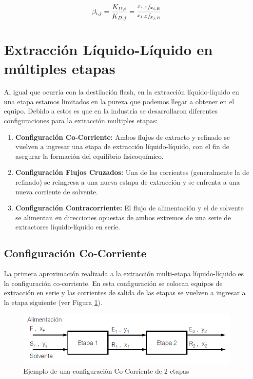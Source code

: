 \documentclass[11pt]{book}
\begin{document}
\begin{equation}
    \label{eq:Extraccion_LiqLiq_4}
    \beta_{i,j} = \frac{K_{D,i}}{K_{D,j}} = \frac{\sfrac{x_{i,E}}{x_{i,R}}}{\sfrac{x_{j,E}}{x_{j,R}}}
\end{equation}

\section{Extracción Líquido-Líquido en múltiples etapas}

Al igual que ocurría con la destilación flash, en la extracción líquido-líquido en una etapa estamos limitados en la pureza que podemos llegar a obtener en el equipo. Debido a estos es que en la industría se desarrollaron diferentes configuraciones para la extracción multiples etapas:

\begin{enumerate}
    \item \textbf{Configuración Co-Corriente:} Ambos flujos de extracto y refinado se vuelven a ingresar una etapa de extracción líquido-líquido, con el fin de asegurar la formación del equilibrio fisicoquímico.
    
    \item \textbf{Configuración Flujos Cruzados:} Una de las corrientes (generalmente la de refinado) se reingresa a una nueva estapa de extracción y se enfrenta a una nueva corriente de solvente.
    
    \item \textbf{Configuración Contracorriente:} El flujo de alimentación y el de solvente se alimentan en direcciones opuestas de ambos extremos de una serie de extractores líquido-líquido en seríe.
\end{enumerate}

\subsection{Configuración Co-Corriente}

La primera aproximación realizada a la extracción multi-etapa líquido-líquido es la configuración co-corriente. En esta configuración se colocan equipos de extracción en serie y las corrientes de salida de las etapas se vuelven a ingresar a la etapa siguiente (ver Figura \ref{fig:ExtraccionLiqLiqCocorriente}).

\begin{figure}[H]
    \centering
    \includegraphics{img/LiquidoLiquido/ExtracionLiqLiqCoCorriente.PNG}
    \caption{Ejemplo de una configuración Co-Corriente de 2 etapas}
    \label{fig:ExtraccionLiqLiqCocorriente}
\end{figure}
\end{document}
